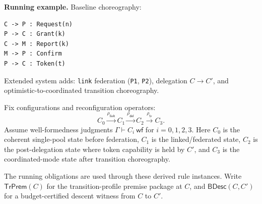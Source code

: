 \documentclass[a4paper,10pt,twocolumn,english]{article}
\numberwithin{equation}{section}
\theoremstyle{paperdef}
\theoremstyle{paperplain}
\theoremstyle{paperdef}
\theoremstyle{paperremark}
\theoremstyle{paperdef}
\newcommand{\wf}{\ensuremath{\mathsf{wf}}}
\begin{document}
\noindent\begingroup\raggedright
\textbf{Running example.} Baseline choreography:
\par\endgroup

\noindent\begin{minipage}{\columnwidth}
	\begin{lstlisting}
C -> P : Request(n)
P -> C : Grant(k)
C -> M : Report(k)
M -> P : Confirm
P -> C : Token(t)
\end{lstlisting}
\end{minipage}

Extended system adds: \texttt{link} federation (\texttt{P1}, \texttt{P2}),
delegation $C \to C'$, and optimistic-to-coordinated transition choreography.

Fix configurations and reconfiguration operators:
\begin{equation}
	C_0 \xrightarrow{\rho_{\mathsf{link}}} C_1 \xrightarrow{\rho_{\mathsf{del}}}
	C_2 \xrightarrow{\rho_{\mathsf{tr}}} C_3.
\end{equation}
Assume well-formedness judgments $\Gamma \vdash C_i\ \wf$ for $i=0,1,2,3$. Here $C_0$ is the coherent single-pool state before federation, $C_1$ is the linked/federated state, $C_2$ is the post-delegation state where token capability is held by $C'$, and $C_3$ is the coordinated-mode state after transition choreography.

The running obligations are used through these derived rule instances.
Write $\mathsf{TrPrem}(C)$ for the transition-profile premise package at $C$, and
$\mathsf{BDesc}(C,C')$ for a budget-certified descent witness from $C$ to $C'$.
\end{document}
